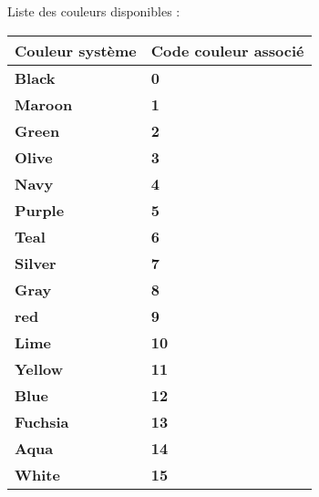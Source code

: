 \documentclass[a4paper,10pt]{article}
\begin{document}
    \begin{justify}
        Liste des couleurs disponibles :

        \begin{tabular}{|l|l|}
            \hline
            \textbf{Couleur système} & \textbf{Code couleur associé}\\
            \hline
            \textbf{\color{text}Black} & \textbf{\color{text}0}\\
            \hline
            \textbf{\color{Maroon}Maroon} & \textbf{\color{Maroon}1}\\
            \hline
            \textbf{\color{Green}Green} & \textbf{\color{Green}2}\\
            \hline
            \textbf{\color{Olive}Olive} & \textbf{\color{Olive}3}\\
            \hline
            \textbf{\color{Navy}Navy} & \textbf{\color{Navy}4}\\
            \hline
            \textbf{\color{Purple}Purple} & \textbf{\color{Purple}5}\\
            \hline
            \textbf{\color{Teal}Teal} & \textbf{\color{Teal}6}\\
            \hline
            \textbf{\color{Silver}Silver} & \textbf{\color{Silver}7}\\
            \hline
            \textbf{\color{Gray}Gray} & \textbf{\color{Gray}8}\\
            \hline
            \textbf{\color{Red}red} & \textbf{\color{Red}9}\\
            \hline
            \textbf{\color{Lime}Lime} & \textbf{\color{Lime}10}\\
            \hline
            \textbf{\color{Yellow}Yellow} & \textbf{\color{Yellow}11}\\
            \hline
            \textbf{\color{Blue}Blue} & \textbf{\color{Blue}12}\\
            \hline
            \textbf{\color{Fuchsia}Fuchsia} & \textbf{\color{Fuchsia}13}\\
            \hline
            \textbf{\color{Aqua}Aqua} & \textbf{\color{Aqua}14}\\
            \hline
            \textbf{\color{White}White} & \textbf{\color{White}15}\\
            \hline
        \end{tabular}


\end{justify}
\end{document}
